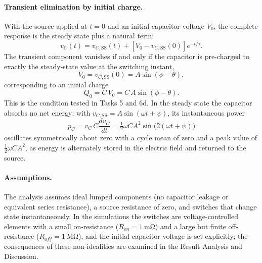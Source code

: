 \documentclass[12pt,a4paper]{article}
\begin{document}
	\paragraph{Transient elimination by initial charge.}
	With the source applied at $t = 0$ and an initial capacitor voltage
	$V_0$, the complete response is the steady state plus a natural term:
	\begin{equation}
		v_C(t) = v_{C,\mathrm{SS}}(t)
		+ \left[V_0 - v_{C,\mathrm{SS}}(0)\right] e^{-t/\tau}.
		\label{eq:complete-sine}
	\end{equation}
	The transient component vanishes if and only if the capacitor is
	pre-charged to exactly the steady-state value at the switching
	instant,
	\begin{equation}
		V_0 = v_{C,\mathrm{SS}}(0) = A \sin(\phi - \theta),
		\label{eq:ic-cond}
	\end{equation}
	corresponding to an initial charge
	\begin{equation}
		Q_0 = C\,V_0 = C\,A\sin(\phi - \theta).
		\label{eq:q0}
	\end{equation}
	This is the condition tested in Tasks 5 and 6d.  In the steady state
	the capacitor absorbs no net energy: with
	$v_{C,\mathrm{SS}} = A\sin(\omega t + \psi)$, its instantaneous power
	\begin{equation}
		p_C = v_C\,C\frac{dv_C}{dt}
		= \tfrac{1}{2}\omega C A^{2}\sin\!\bigl(2(\omega t + \psi)\bigr)
		\label{eq:pcap}
	\end{equation}
	oscillates symmetrically about zero with a cycle mean of zero and a
	peak value of $\tfrac{1}{2}\omega C A^{2}$, as energy is alternately
	stored in the electric field and returned to the source.
	
	\paragraph{Assumptions.}
	The analysis assumes ideal lumped components (no capacitor leakage or
	equivalent series resistance), a source resistance of zero, and
	switches that change state instantaneously.  In the simulations the
	switches are voltage-controlled elements with a small on-resistance
	($R_{on} = \SI{1}{\milli\ohm}$) and a large but finite
	off-resistance ($R_{off} = \SI{1}{\mega\ohm}$), and the initial
	capacitor voltage is set explicitly; the consequences of these
	non-idealities are examined in the Result Analysis and Discussion.
	
\end{document}

